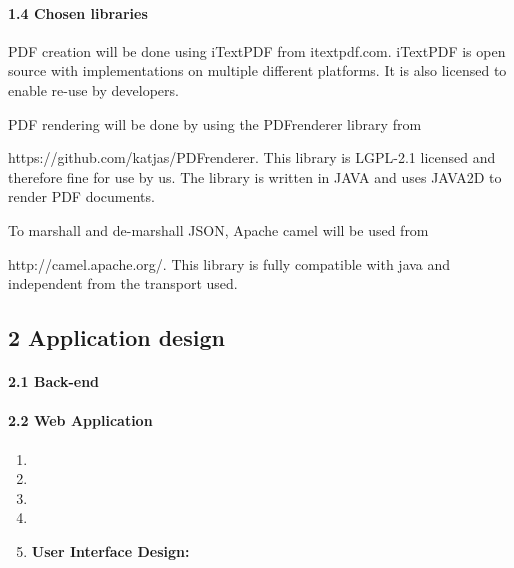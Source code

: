 \documentclass{article}
\begin{document}
\paragraph{1.4  Chosen libraries}

 PDF creation will be done using iTextPDF from itextpdf.com. iTextPDF is open source with implementations on multiple different platforms. It is also licensed to enable re-use by developers.



PDF rendering will be done by using the PDFrenderer library from 

https://github.com/katjas/PDFrenderer. This library is LGPL-2.1 licensed and therefore fine for use by us. The library is written in JAVA and uses JAVA2D to render PDF documents.



To marshall and de-marshall JSON, Apache camel will be used from 

http://camel.apache.org/. This library is fully compatible with java and independent from the transport used.




\subsection{2  Application design}

 


\paragraph{2.1  Back-end}

  

     

     

     

     

     

     

 


\paragraph{2.2  Web Application}

\noindent 

\begin{enumerate}
\item  

\item  

\item  

\item  

\item  \textbf{User Interface Design:}
\end{enumerate}
\end{document}
